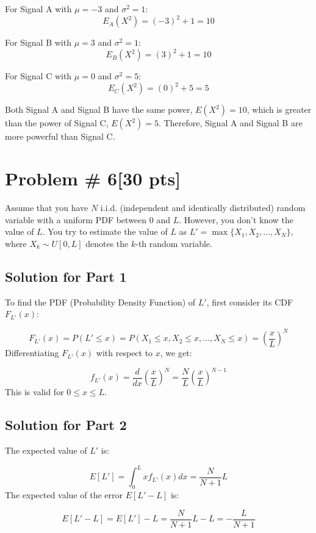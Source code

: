 \documentclass{article}
\begin{document}
For Signal A with \(\mu = -3\) and \(\sigma^2 = 1\):
\[
E_A(X^2) = (-3)^2 + 1 = 10
\]

For Signal B with \(\mu = 3\) and \(\sigma^2 = 1\):
\[
E_B(X^2) = (3)^2 + 1 = 10
\]

For Signal C with \(\mu = 0\) and \(\sigma^2 = 5\):
\[
E_C(X^2) = (0)^2 + 5 = 5
\]

Both Signal A and Signal B have the same power, \(E(X^2) = 10\), which is greater than the power of Signal C, \(E(X^2) = 5\). Therefore, Signal A and Signal B are more powerful than Signal C.
\newpage

\section*{Problem \# 6[30 pts]}

Assume that you have \(N\) i.i.d. (independent and identically distributed) random variable with a uniform PDF between 0 and \(L\). However, you don't know the value of \(L\). You try to estimate the value of \(L\) as \(L' = \max\{X_1, X_2, \ldots, X_N\}\), where \(X_k \sim U[0, L]\) denotes the \(k\)-th random variable.

\subsection*{Solution for Part 1}

To find the PDF (Probability Density Function) of \(L'\), first consider its CDF \(F_{L'}(x)\):

\[
F_{L'}(x) = P(L' \leq x) = P(X_1 \leq x, X_2 \leq x, \ldots, X_N \leq x) = \left(\frac{x}{L}\right)^N
\]
Differentiating \(F_{L'}(x)\) with respect to \(x\), we get:

\[
f_{L'}(x) = \frac{d}{dx} \left(\frac{x}{L}\right)^N = \frac{N}{L} \left(\frac{x}{L}\right)^{N-1}
\]
This is valid for \(0 \leq x \leq L\).

\subsection*{Solution for Part 2}
The expected value of \(L'\) is:

\[
E[L'] = \int_{0}^{L} x f_{L'}(x) dx = \frac{N}{N+1}L
\]
The expected value of the error \(E[L' - L]\) is:

\[
E[L' - L] = E[L'] - L = \frac{N}{N+1}L - L = -\frac{L}{N+1}
\]
\end{document}

